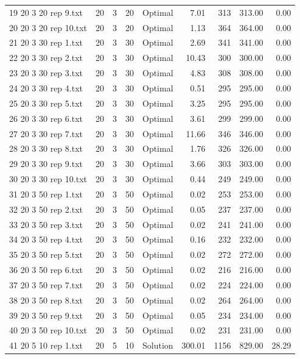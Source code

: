 \begin{longtable}{lrrllrrrr}
19 20 3 20 rep 9.txt & 20 & 3 & 20 & Optimal &  7.01 & 313 & 313.00 &  0.00\\
20 20 3 20 rep 10.txt & 20 & 3 & 20 & Optimal &  1.13 & 364 & 364.00 &  0.00\\
21 20 3 30 rep 1.txt & 20 & 3 & 30 & Optimal &  2.69 & 341 & 341.00 &  0.00\\
22 20 3 30 rep 2.txt & 20 & 3 & 30 & Optimal & 10.43 & 300 & 300.00 &  0.00\\
23 20 3 30 rep 3.txt & 20 & 3 & 30 & Optimal &  4.83 & 308 & 308.00 &  0.00\\
24 20 3 30 rep 4.txt & 20 & 3 & 30 & Optimal &  0.51 & 295 & 295.00 &  0.00\\
25 20 3 30 rep 5.txt & 20 & 3 & 30 & Optimal &  3.25 & 295 & 295.00 &  0.00\\
26 20 3 30 rep 6.txt & 20 & 3 & 30 & Optimal &  3.61 & 299 & 299.00 &  0.00\\
27 20 3 30 rep 7.txt & 20 & 3 & 30 & Optimal & 11.66 & 346 & 346.00 &  0.00\\
28 20 3 30 rep 8.txt & 20 & 3 & 30 & Optimal &  1.76 & 326 & 326.00 &  0.00\\
29 20 3 30 rep 9.txt & 20 & 3 & 30 & Optimal &  3.66 & 303 & 303.00 &  0.00\\
30 20 3 30 rep 10.txt & 20 & 3 & 30 & Optimal &  0.44 & 249 & 249.00 &  0.00\\
31 20 3 50 rep 1.txt & 20 & 3 & 50 & Optimal &  0.02 & 253 & 253.00 &  0.00\\
32 20 3 50 rep 2.txt & 20 & 3 & 50 & Optimal &  0.05 & 237 & 237.00 &  0.00\\
33 20 3 50 rep 3.txt & 20 & 3 & 50 & Optimal &  0.02 & 241 & 241.00 &  0.00\\
34 20 3 50 rep 4.txt & 20 & 3 & 50 & Optimal &  0.16 & 232 & 232.00 &  0.00\\
35 20 3 50 rep 5.txt & 20 & 3 & 50 & Optimal &  0.02 & 272 & 272.00 &  0.00\\
36 20 3 50 rep 6.txt & 20 & 3 & 50 & Optimal &  0.02 & 216 & 216.00 &  0.00\\
37 20 3 50 rep 7.txt & 20 & 3 & 50 & Optimal &  0.02 & 224 & 224.00 &  0.00\\
38 20 3 50 rep 8.txt & 20 & 3 & 50 & Optimal &  0.02 & 264 & 264.00 &  0.00\\
39 20 3 50 rep 9.txt & 20 & 3 & 50 & Optimal &  0.05 & 234 & 234.00 &  0.00\\
40 20 3 50 rep 10.txt & 20 & 3 & 50 & Optimal &  0.02 & 231 & 231.00 &  0.00\\
41 20 5 10 rep 1.txt & 20 & 5 & 10 & Solution & 300.01 & 1156 & 829.00 & 28.29\\

\end{longtable}
